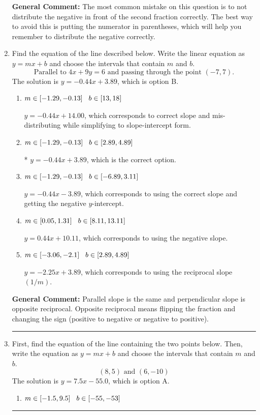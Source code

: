 \documentclass{extbook}[14pt]
\newcommand{\litem}[1]{\item #1

\rule{\textwidth}{0.4pt}}
\begin{document}
\begin{enumerate}
{\textbf{General Comment:} The most common mistake on this question is to not distribute the negative in front of the second fraction correctly. The best way to avoid this is putting the numerator in parentheses, which will help you remember to distribute the negative correctly.
}
\litem{
Find the equation of the line described below. Write the linear equation as $ y=mx+b $ and choose the intervals that contain $m$ and $b$.
\[ \text{Parallel to } 4 x + 9 y = 6 \text{ and passing through the point } (-7, 7). \]The solution is \( y = -0.44x + 3.89 \), which is option B.\begin{enumerate}[label=\Alph*.]
\item \( m \in [-1.29, -0.13] \hspace*{3mm} b \in [13, 18] \)

 $y = -0.44x + 14.00$, which corresponds to correct slope and mis-distributing while simplifying to slope-intercept form.
\item \( m \in [-1.29, -0.13] \hspace*{3mm} b \in [2.89, 4.89] \)

* $y = -0.44x + 3.89$, which is the correct option.
\item \( m \in [-1.29, -0.13] \hspace*{3mm} b \in [-6.89, 3.11] \)

 $y = -0.44x - 3.89$, which corresponds to using the correct slope and getting the negative $y$-intercept.
\item \( m \in [0.05, 1.31] \hspace*{3mm} b \in [8.11, 13.11] \)

 $y = 0.44x + 10.11$, which corresponds to using the negative slope.
\item \( m \in [-3.06, -2.1] \hspace*{3mm} b \in [2.89, 4.89] \)

 $y = -2.25x + 3.89$, which corresponds to using the reciprocal slope $(1/m)$.
\end{enumerate}

\textbf{General Comment:} Parallel slope is the same and perpendicular slope is opposite reciprocal. Opposite reciprocal means flipping the fraction and changing the sign (positive to negative or negative to positive).
}
\litem{
First, find the equation of the line containing the two points below. Then, write the equation as $ y=mx+b $ and choose the intervals that contain $m$ and $b$.
\[ (8, 5) \text{ and } (6, -10) \]The solution is \( y = 7.5x -55.0 \), which is option A.\begin{enumerate}[label=\Alph*.]
\item \( m \in [-1.5, 9.5] \hspace*{3mm} b \in [-55, -53] \)


\end{enumerate}}
\end{enumerate}
\end{document}
